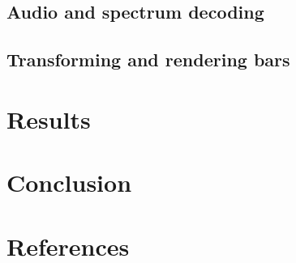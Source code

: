 \documentclass[11pt]{article}
\begin{document}
\subsection{Audio and spectrum decoding}

\subsection{Transforming and rendering bars}

\section{Results}

\section{Conclusion}

\section{References}
\printbibliography[heading=none]
\end{document}
